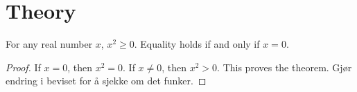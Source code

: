 \section{Theory}
\begin{thm}
    For any real number $x$, $x^2 \geq 0$. Equality holds if and only if $x=0$.
\end{thm}
\begin{proof}
    If $x=0$, then $x^2=0$. If $x\neq 0$, then $x^2 > 0$. This proves the theorem.
    Gjør endring i beviset for å sjekke om det funker.
\end{proof}
